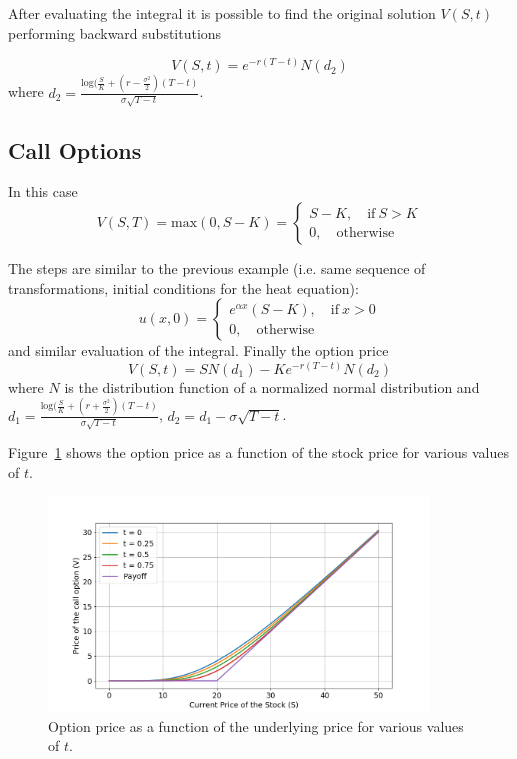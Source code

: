 After evaluating the integral it is possible to find the original solution $V(S,t)$ performing backward substitutions

\begin{equation}
V(S, t) = e^{-r(T-t)}N(d_2)
\end{equation}
where $d_2=\frac{\textrm{log}(\frac{S}{K}+\left(r-\frac{\sigma^2}{2}\right)(T-t)}{\sigma\sqrt{T-t}}$.

\subsection{Call Options}
In this case
\begin{equation}
V(S,T)=\textrm{max}(0,S-K)=
\begin{cases}
S-K,\quad \textrm{if}~S>K\\
0, \quad\textrm{otherwise}
\end{cases}
\end{equation}

The steps are similar to the previous example (i.e. same sequence of transformations, initial conditions for the heat equation):
\begin{equation}
u(x,0)=
\begin{cases}
e^{\alpha x}(S-K),\quad \textrm{if}~x>0\\
0, \quad\textrm{otherwise}
\end{cases}
\end{equation}
and similar evaluation of the integral. Finally the option price
\begin{equation}
V(S,t) = SN(d_1)-Ke^{-r(T-t)}N(d_2)
\end{equation}
where $N$ is the distribution function of a normalized normal distribution and  $d_1=\frac{\textrm{log}(\frac{S}{K}+\left(r+\frac{\sigma^2}{2}\right)(T-t)}{\sigma\sqrt{T-t}}$, $d_2=d_1-\sigma\sqrt{T-t}$.

Figure~\ref{fig:call_option} shows the option price as a function of the stock price for various values of $t$.

\begin{figure}[htb]
  \centering
  \includegraphics[width=0.9\textwidth]{figures/call_option_price}
  \caption{Option price as a function of the underlying price for various values of $t$.}
  \label{fig:call_option}
\end{figure}

